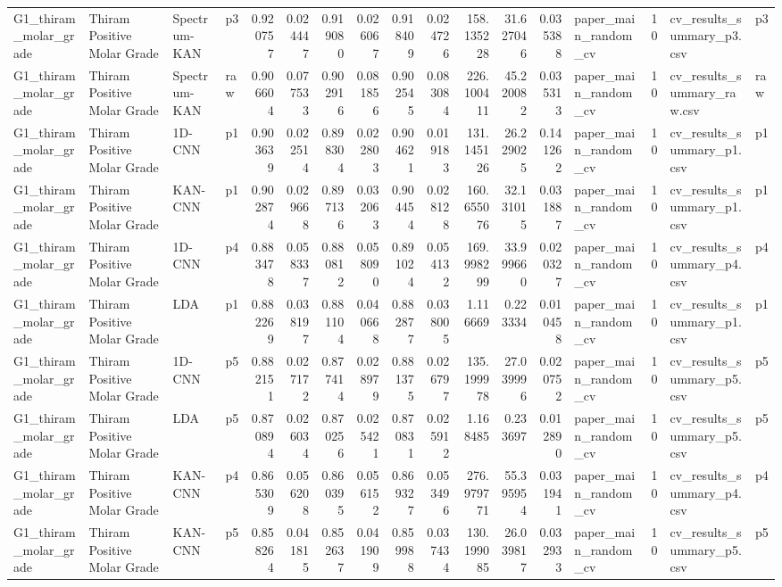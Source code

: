 \begin{tabular}{llllrrrrrrrrrlrll}
G1_thiram_molar_grade & Thiram Positive Molar Grade & Spectrum-KAN & p3 & 0.920757 & 0.024447 & 0.919080 & 0.026067 & 0.918409 & 0.024726 & 158.135228 & 31.627046 & 0.035388 & paper_main_random_cv & 10 & cv_results_summary_p3.csv & p3 \\
G1_thiram_molar_grade & Thiram Positive Molar Grade & Spectrum-KAN & raw & 0.906604 & 0.077533 & 0.902916 & 0.081856 & 0.902545 & 0.083084 & 226.100411 & 45.220082 & 0.035313 & paper_main_random_cv & 10 & cv_results_summary_raw.csv & raw \\
G1_thiram_molar_grade & Thiram Positive Molar Grade & 1D-CNN & p1 & 0.903639 & 0.022514 & 0.898304 & 0.022803 & 0.904621 & 0.019183 & 131.145126 & 26.229025 & 0.141262 & paper_main_random_cv & 10 & cv_results_summary_p1.csv & p1 \\
G1_thiram_molar_grade & Thiram Positive Molar Grade & KAN-CNN & p1 & 0.902874 & 0.029668 & 0.897136 & 0.032063 & 0.904454 & 0.028128 & 160.655076 & 32.131015 & 0.031887 & paper_main_random_cv & 10 & cv_results_summary_p1.csv & p1 \\
G1_thiram_molar_grade & Thiram Positive Molar Grade & 1D-CNN & p4 & 0.883478 & 0.058337 & 0.880812 & 0.058090 & 0.891024 & 0.054132 & 169.998299 & 33.999660 & 0.020327 & paper_main_random_cv & 10 & cv_results_summary_p4.csv & p4 \\
G1_thiram_molar_grade & Thiram Positive Molar Grade & LDA & p1 & 0.882269 & 0.038197 & 0.881104 & 0.040668 & 0.882877 & 0.038005 & 1.116669 & 0.223334 & 0.010458 & paper_main_random_cv & 10 & cv_results_summary_p1.csv & p1 \\
G1_thiram_molar_grade & Thiram Positive Molar Grade & 1D-CNN & p5 & 0.882151 & 0.027172 & 0.877414 & 0.028979 & 0.881375 & 0.026797 & 135.199978 & 27.039996 & 0.020752 & paper_main_random_cv & 10 & cv_results_summary_p5.csv & p5 \\
G1_thiram_molar_grade & Thiram Positive Molar Grade & LDA & p5 & 0.870894 & 0.026034 & 0.870256 & 0.025421 & 0.870831 & 0.025912 & 1.168485 & 0.233697 & 0.012890 & paper_main_random_cv & 10 & cv_results_summary_p5.csv & p5 \\
G1_thiram_molar_grade & Thiram Positive Molar Grade & KAN-CNN & p4 & 0.865309 & 0.056208 & 0.860395 & 0.056152 & 0.869327 & 0.053496 & 276.979771 & 55.395954 & 0.031941 & paper_main_random_cv & 10 & cv_results_summary_p4.csv & p4 \\
G1_thiram_molar_grade & Thiram Positive Molar Grade & KAN-CNN & p5 & 0.858264 & 0.041815 & 0.852637 & 0.041909 & 0.859988 & 0.037434 & 130.199085 & 26.039817 & 0.032933 & paper_main_random_cv & 10 & cv_results_summary_p5.csv & p5 \\

\end{tabular}
